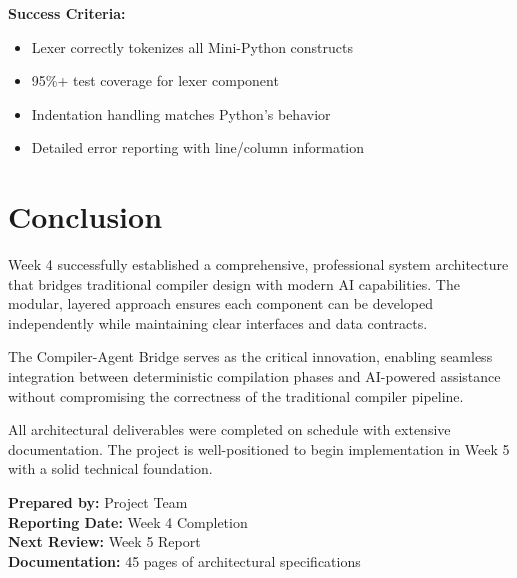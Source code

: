 \documentclass[a4paper,11pt]{article}
\begin{document}
\textbf{Success Criteria:}
\begin{itemize}[leftmargin=*]
    \item Lexer correctly tokenizes all Mini-Python constructs
    \item 95\%+ test coverage for lexer component
    \item Indentation handling matches Python's behavior
    \item Detailed error reporting with line/column information
\end{itemize}

\section{Conclusion}

Week 4 successfully established a comprehensive, professional system architecture that bridges traditional compiler design with modern AI capabilities. The modular, layered approach ensures each component can be developed independently while maintaining clear interfaces and data contracts.

The Compiler-Agent Bridge serves as the critical innovation, enabling seamless integration between deterministic compilation phases and AI-powered assistance without compromising the correctness of the traditional compiler pipeline.

All architectural deliverables were completed on schedule with extensive documentation. The project is well-positioned to begin implementation in Week 5 with a solid technical foundation.

\vspace{5mm}
\noindent\textbf{Prepared by:} Project Team \\
\textbf{Reporting Date:} Week 4 Completion \\
\textbf{Next Review:} Week 5 Report \\
\textbf{Documentation:} 45 pages of architectural specifications
\end{document}
